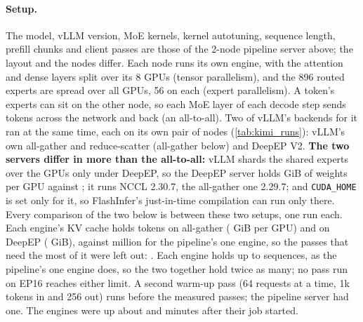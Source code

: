 \paragraph{Setup.} The model, vLLM version, MoE kernels, kernel autotuning, sequence length, prefill chunks and client passes are those of the 2-node pipeline server above; the layout and the nodes differ. Each node runs its own engine, with the attention and dense layers split over its 8 GPUs (tensor parallelism), and the 896 routed experts are spread over all \TriKxnGpus{} GPUs, 56 on each (expert parallelism). A token's experts can sit on the other node, so each MoE layer of each decode step sends tokens across the network and back (an all-to-all). Two of vLLM's backends for it ran at the same time, each on its own pair of nodes (\cref{tab:kimi_runs}): vLLM's own all-gather and reduce-scatter (all-gather below) and DeepEP V2. \textbf{The two servers differ in more than the all-to-all:} vLLM shards the shared experts over the GPUs only under DeepEP, so the DeepEP server holds \TriKxnWeightsDp{} GiB of weights per GPU against \TriKxnWeightsAg; it runs NCCL 2.30.7, the all-gather one 2.29.7; and \texttt{CUDA\_HOME} is set only for it, so FlashInfer's just-in-time compilation can run only there. Every comparison of the two below is between these two setups, one run each. Each engine's KV cache holds \TriKxnKvTokAg{} tokens on all-gather (\TriKxnKvGibAg{} GiB per GPU) and \TriKxnKvTokDp{} on DeepEP (\TriKxnKvGibDp{} GiB), against \TriKimiKvTokens{} million for the pipeline's one engine, so the passes that need the most of it were left out: \TriKxnNotRun. Each engine holds up to \TriKxnMaxSeqs{} sequences, as the pipeline's one engine does, so the two together hold twice as many; no pass run on EP16 reaches either limit. A second warm-up pass (64 requests at a time, 1k tokens in and 256 out) runs before the measured passes; the pipeline server had one. The engines were up about \TriKxnUpAg{} and \TriKxnUpDp{} minutes after their job started.

